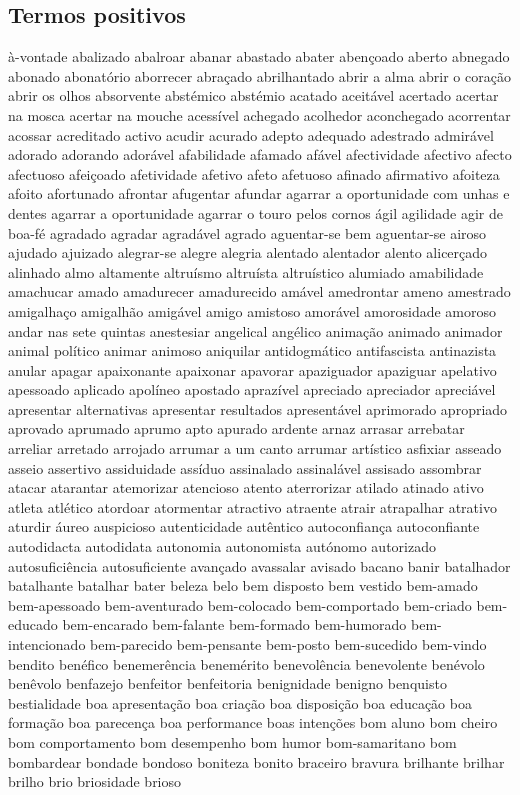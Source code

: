 \subsection{Termos positivos}
\`{a}-vontade abalizado abalroar abanar abastado abater aben\c{c}oado aberto abnegado abonado abonat\'{o}rio aborrecer abra\c{c}ado abrilhantado abrir a alma abrir o cora\c{c}\~ao abrir os olhos absorvente abst\'{e}mico abst\'{e}mio acatado aceit\'{a}vel acertado acertar na mosca acertar na mouche acess\'{i}vel achegado acolhedor aconchegado acorrentar acossar acreditado activo acudir acurado adepto adequado adestrado admir\'{a}vel adorado adorando ador\'{a}vel afabilidade afamado af\'{a}vel afectividade afectivo afecto afectuoso afei\c{c}oado afetividade afetivo afeto afetuoso afinado afirmativo afoiteza afoito afortunado afrontar afugentar afundar agarrar a oportunidade com unhas e dentes agarrar a oportunidade agarrar o touro pelos cornos \'{a}gil agilidade agir de boa-f\'{e} agradado agradar agrad\'{a}vel agrado aguentar-se bem aguentar-se airoso ajudado ajuizado alegrar-se alegre alegria alentado alentador alento alicer\c{c}ado alinhado almo altamente altru\'{i}smo altru\'{i}sta altru\'{i}stico alumiado amabilidade amachucar amado amadurecer amadurecido am\'{a}vel amedrontar ameno amestrado amigalha\c{c}o amigalh\~ao amig\'{a}vel amigo amistoso amor\'{a}vel amorosidade amoroso andar nas sete quintas anestesiar angelical ang\'{e}lico anima\c{c}\~ao animado animador animal pol\'{i}tico animar animoso aniquilar antidogm\'{a}tico antifascista antinazista anular apagar apaixonante apaixonar apavorar apaziguador apaziguar apelativo apessoado aplicado apol\'{i}neo apostado apraz\'{i}vel apreciado apreciador apreci\'{a}vel apresentar alternativas apresentar resultados apresent\'{a}vel aprimorado apropriado aprovado aprumado aprumo apto apurado ardente arnaz arrasar arrebatar arreliar arretado arrojado arrumar a um canto arrumar art\'{i}stico asfixiar asseado asseio assertivo assiduidade ass\'{i}duo assinalado assinal\'{a}vel assisado assombrar atacar atarantar atemorizar atencioso atento aterrorizar atilado atinado ativo atleta atl\'{e}tico atordoar atormentar atractivo atraente atrair atrapalhar atrativo aturdir \'{a}ureo auspicioso autenticidade aut\^{e}ntico autoconfian\c{c}a autoconfiante autodidacta autodidata autonomia autonomista aut\'{o}nomo autorizado autosufici\^{e}ncia autosuficiente avan\c{c}ado avassalar avisado bacano banir batalhador batalhante batalhar bater beleza belo bem disposto bem vestido bem-amado bem-apessoado bem-aventurado bem-colocado bem-comportado bem-criado bem-educado bem-encarado bem-falante bem-formado bem-humorado bem-intencionado bem-parecido bem-pensante bem-posto bem-sucedido bem-vindo bendito ben\'{e}fico benemer\^{e}ncia benem\'{e}rito benevol\^{e}ncia benevolente ben\'{e}volo ben\^{e}volo benfazejo benfeitor benfeitoria benignidade benigno benquisto bestialidade boa apresenta\c{c}\~ao boa cria\c{c}\~ao boa disposi\c{c}\~ao boa educa\c{c}\~ao boa forma\c{c}\~ao boa parecen\c{c}a boa performance boas inten\c{c}\~oes bom aluno bom cheiro bom comportamento bom desempenho bom humor bom-samaritano bom bombardear bondade bondoso boniteza bonito braceiro bravura brilhante brilhar brilho brio briosidade brioso 